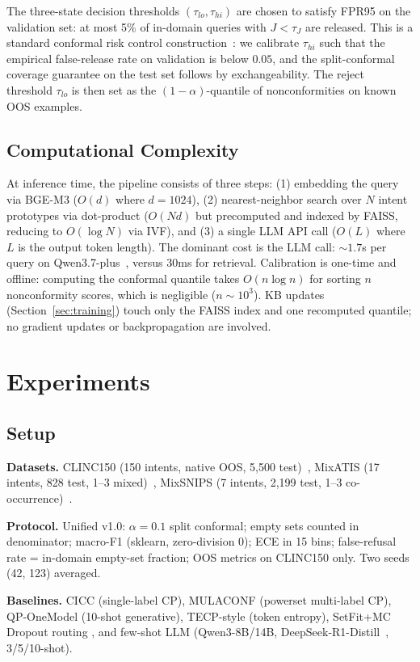 \documentclass[sigconf, anonymous, review]{acmart}
\begin{document}
The three-state decision thresholds $(\tau_{lo},\tau_{hi})$ are chosen to satisfy FPR95 on the validation set: at most 5\% of in-domain queries with $J<\tau_J$ are released. This is a standard conformal risk control construction~\citep{rcps}: we calibrate $\tau_{hi}$ such that the empirical false-release rate on validation is below $0.05$, and the split-conformal coverage guarantee on the test set follows by exchangeability. The reject threshold $\tau_{lo}$ is then set as the $(1-\alpha)$-quantile of nonconformities on known OOS examples.

\subsection{Computational Complexity}
At inference time, the pipeline consists of three steps: (1) embedding the query via BGE-M3 ($O(d)$ where $d=1024$), (2) nearest-neighbor search over $N$ intent prototypes via dot-product ($O(Nd)$ but precomputed and indexed by FAISS, reducing to $O(\log N)$ via IVF), and (3) a single LLM API call ($O(L)$ where $L$ is the output token length). The dominant cost is the LLM call: ${\sim}1.7$s per query on Qwen3.7-plus~\citep{qwen3}, versus 30ms for retrieval. Calibration is one-time and offline: computing the conformal quantile takes $O(n\log n)$ for sorting $n$ nonconformity scores, which is negligible ($n{\sim}10^3$). KB updates (Section~\ref{sec:training}) touch only the FAISS index and one recomputed quantile; no gradient updates or backpropagation are involved.

\section{Experiments}
\label{sec:experiments}

\subsection{Setup}
\textbf{Datasets.} CLINC150 (150 intents, native OOS, 5,500 test)~\citep{clinc150}, MixATIS (17 intents, 828 test, 1--3 mixed)~\citep{mixatis}, MixSNIPS (7 intents, 2,199 test, 1--3 co-occurrence)~\citep{mixsnips,agif}.

\textbf{Protocol.} Unified v1.0: $\alpha=0.1$ split conformal; empty sets counted in denominator; macro-F1 (sklearn, zero-division 0); ECE in 15 bins; false-refusal rate = in-domain empty-set fraction; OOS metrics on CLINC150 only. Two seeds (42, 123) averaged.

\textbf{Baselines.} CICC \citep{cicc} (single-label CP), MULACONF \citep{mulaconf} (powerset multi-label CP), QP-OneModel \citep{qp-onemodel} (10-shot generative), TECP-style \citep{tecp} (token entropy), SetFit+MC Dropout routing \citep{ageofllm}, and few-shot LLM (Qwen3-8B/14B, DeepSeek-R1-Distill~\citep{deepseekr1}, 3/5/10-shot).
\end{document}
